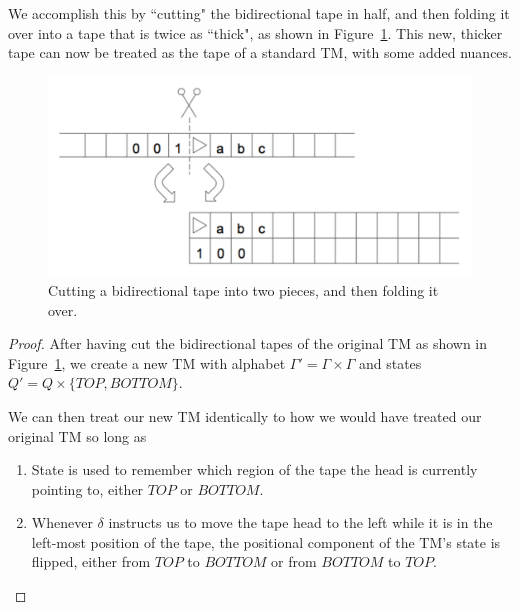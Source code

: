 \documentclass[usletter]{article}
\begin{document}
We accomplish this by ``cutting" the bidirectional tape in half, and then folding it over into a tape that is twice as ``thick", as shown in Figure~\ref{fig:cut}. This new, thicker tape can now be treated as the tape of a standard TM, with some added nuances.

\begin{figure}[h!]
\begin{center}
\includegraphics[width=.7\textwidth]{cut}
\end{center}
\caption{Cutting a bidirectional tape into two pieces, and then folding it over.}
\label{fig:cut}
\end{figure}

\begin{proof}
After having cut the bidirectional tapes of the original TM as shown in Figure~\ref{fig:cut}, we create a new TM with alphabet $\Gamma'=\Gamma\times\Gamma$ and states $Q'=Q\times\{TOP, BOTTOM\}$.

We can then treat our new TM identically to how we would have treated our original TM so long as

\begin{enumerate}
\item State is used to remember which region of the tape the head is currently pointing to, either $TOP$ or $BOTTOM$.
\item Whenever $\delta$ instructs us to move the tape head to the left while it is in the left-most position of the tape, the positional component of the TM's state is flipped, either from $TOP$ to $BOTTOM$ or from $BOTTOM$ to $TOP$.
\end{enumerate}

\end{proof}
\end{document}
